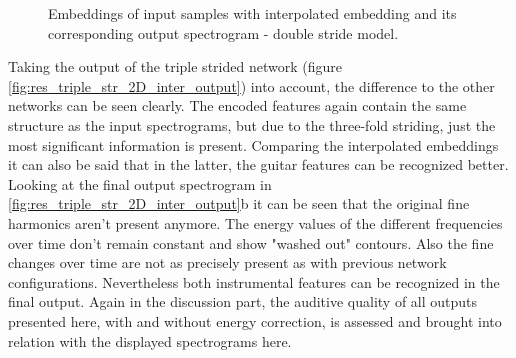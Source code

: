 \begin{figure}[htb!]
    \centering
    \captionsetup{justification=centering}
    \caption{Embeddings of input samples with interpolated embedding and its corresponding output spectrogram - double stride model.}
    \label{fig:res_double_str_2D_inter_output}
\end{figure}

Taking the output of the triple strided network (figure \ref{fig:res_triple_str_2D_inter_output}) into account, the difference to the other networks can be seen clearly. The encoded features again contain the same structure as the input spectrograms, but due to the three-fold striding, just the most significant information is present. Comparing the interpolated embeddings it can also be said that in the latter, the guitar features can be recognized better. Looking at the final output spectrogram in \ref{fig:res_triple_str_2D_inter_output}b it can be seen that the original fine harmonics aren't present anymore. The energy values of the different frequencies over time don't remain constant and show "washed out" contours. Also the fine changes over time are not as precisely present as with previous network configurations. Nevertheless both instrumental features can be recognized in the final output. Again in the discussion part, the auditive quality of all outputs presented here, with and without energy correction, is assessed and brought into relation with the displayed spectrograms here.

